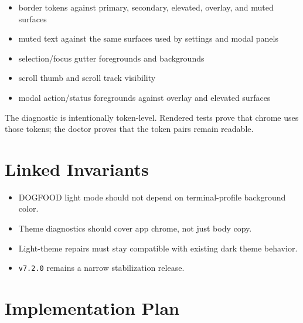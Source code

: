 \begin{itemize}
\tightlist
\item
  border tokens against primary, secondary, elevated, overlay, and muted surfaces
\item
  muted text against the same surfaces used by settings and modal panels
\item
  selection/focus gutter foregrounds and backgrounds
\item
  scroll thumb and scroll track visibility
\item
  modal action/status foregrounds against overlay and elevated surfaces
\end{itemize}

The diagnostic is intentionally token-level. Rendered tests prove that chrome uses those tokens; the doctor proves that the token pairs remain readable.

\section{Linked Invariants}\label{record-182-linked-invariants}

\begin{itemize}
\tightlist
\item
  DOGFOOD light mode should not depend on terminal-profile background color.
\item
  Theme diagnostics should cover app chrome, not just body copy.
\item
  Light-theme repairs must stay compatible with existing dark theme behavior.
\item
  \texttt{v\allowbreak{}7\allowbreak{}.\allowbreak{}2\allowbreak{}.\allowbreak{}0} remains a narrow stabilization release.
\end{itemize}

\section{Implementation Plan}\label{record-182-implementation-plan}

